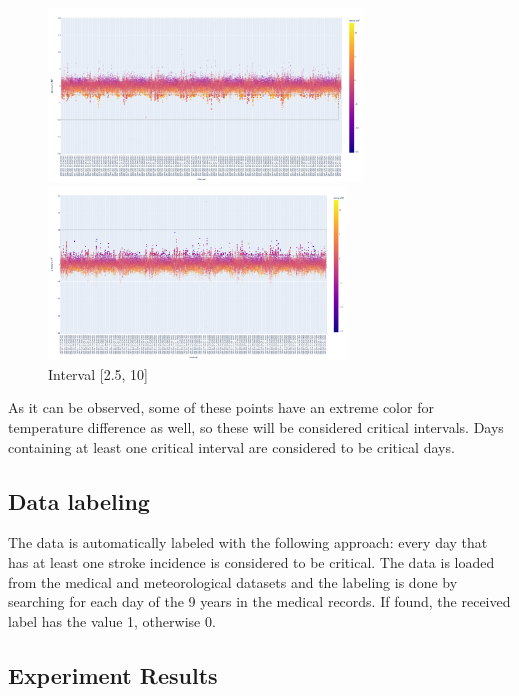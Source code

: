 \documentclass{article}
\begin{document}
\begin{figure}[h!] 
\begin{multicols}{2}

\centering
\includegraphics[height=4.6cm]{newplot (3).png}
\caption{Interval [-10, -2.5]}
\label{interval1}

\centering
\includegraphics[height=4.6cm]{newplot (2).png}
\caption{Interval [2.5, 10]}
\label{interval2}

\end{multicols}
\end{figure}
\newpage

As it can be observed, some of these points have an extreme color for temperature difference as well, so these will be considered critical intervals. Days containing at least one critical interval are considered to be critical days.

\subsection{Data labeling}

The data is automatically labeled with the following approach: every day that has at least one stroke incidence is considered to be critical. The data is loaded from the medical and meteorological datasets and the labeling is done by searching for each day of the 9 years in the medical records. If found, the received label has the value 1, otherwise 0.

\subsection{Experiment  Results}
\end{document}
